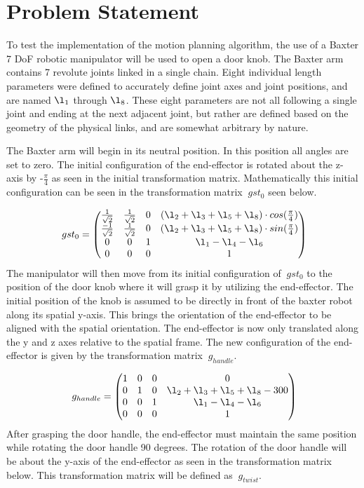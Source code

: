 \documentclass[11pt]{article}
\begin{document}
\section{Problem Statement}
To test the implementation of the motion planning algorithm, the use of a Baxter 7 DoF robotic manipulator will be used to open a door knob. The Baxter arm contains 7 revolute joints linked in a single chain. Eight individual length parameters were defined to accurately define joint axes and joint positions, and are named $\l_1$ through $\l_8$. These eight parameters are not all following a single joint and ending at the next adjacent joint, but rather are defined based on the geometry of the physical links, and are somewhat arbitrary by nature. 
\newline

The Baxter arm will begin in its neutral position. In this position all angles are set to zero. The initial configuration of the end-effector is rotated about the z-axis by -$\frac{\pi}{4}$ as seen in the initial transformation matrix. Mathematically this initial configuration can be seen in the transformation matrix $\ gst_0 $ seen below.

$$
\  gst_0 = \begin{pmatrix}
\frac{1}{\sqrt{2}}&\frac{1}{\sqrt{2}}&0&(\l_2+\l_3+\l_5+\l_8)\cdot cos(\frac{\pi}{4})\\
\frac{-1}{\sqrt{2}}&\frac{1}{\sqrt{2}}&0&(\l_2+\l_3+\l_5+\l_8)\cdot sin(\frac{\pi}{4})\\
0&0&1&\l_1-\l_4-\l_6\\
0&0&0&1\\
\end{pmatrix}
$$
\newline
The manipulator will then move from its initial configuration of $\ gst_0$ to the position of the door knob where it will grasp it by utilizing the end-effector. The initial position of the knob is assumed to be directly in front of the baxter robot along its spatial y-axis. This brings the orientation of the end-effector to be aligned with the spatial orientation. The end-effector is now only translated along the y and z axes relative to the spatial frame. The new configuration of the end-effector is given by the transformation matrix $\ g_{handle}$. 

$$
\  g_{handle} = \begin{pmatrix}
1&0&0&0\\
0&1&0&\l_2+\l_3+\l_5+\l_8 - 300\\
0&0&1&\l_1-\l_4-\l_6\\
0&0&0&1\\
\end{pmatrix}
$$
\newline
After grasping the door handle, the end-effector must maintain the same position while rotating the door handle 90 degrees. The rotation of the door handle will be about the y-axis of the end-effector as seen in the transformation matrix below. This transformation matrix will be defined as $\ g_{twist}$.
\end{document}
